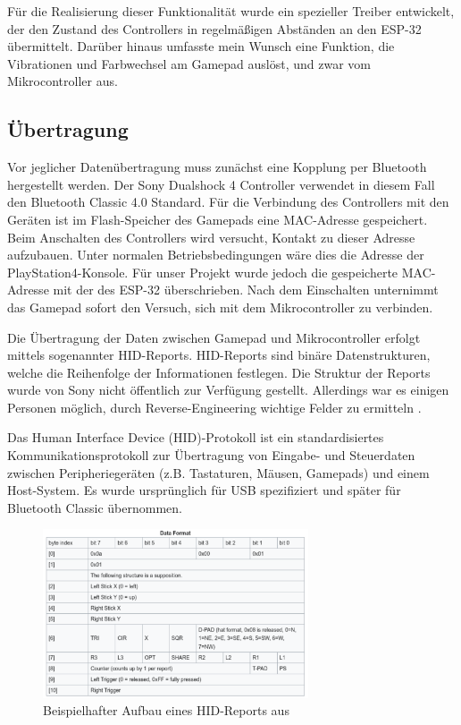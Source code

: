 Für die Realisierung dieser Funktionalität wurde ein spezieller Treiber entwickelt, der den Zustand des Controllers in regelmäßigen Abständen an den ESP-32 übermittelt. 
Darüber hinaus umfasste mein Wunsch eine Funktion, die Vibrationen und Farbwechsel am Gamepad auslöst, und zwar vom Mikrocontroller aus.

\subsection{Übertragung}

Vor jeglicher Datenübertragung muss zunächst eine Kopplung per Bluetooth hergestellt werden. 
Der Sony Dualshock 4 Controller verwendet in diesem Fall den Bluetooth Classic 4.0 Standard.
Für die Verbindung des Controllers mit den Geräten ist im Flash-Speicher des Gamepads eine MAC-Adresse gespeichert. 
Beim Anschalten des Controllers wird versucht, Kontakt zu dieser Adresse aufzubauen.
Unter normalen Betriebsbedingungen wäre dies die Adresse der PlayStation4-Konsole. 
Für unser Projekt wurde jedoch die gespeicherte MAC-Adresse mit der des ESP-32 überschrieben.
Nach dem Einschalten unternimmt das Gamepad sofort den Versuch, sich mit dem Mikrocontroller zu verbinden.

Die Übertragung der Daten zwischen Gamepad und Mikrocontroller erfolgt mittels sogenannter HID-Reports.
HID-Reports sind binäre Datenstrukturen, welche die Reihenfolge der Informationen festlegen.
Die Struktur der Reports wurde von Sony nicht öffentlich zur Verfügung gestellt. 
Allerdings war es einigen Personen möglich, durch Reverse-Engineering wichtige Felder zu ermitteln \cite{esp_ds4_hid_reports}.

Das Human Interface Device (HID)-Protokoll ist ein standardisiertes Kommunikationsprotokoll zur Übertragung von Eingabe- und Steuerdaten zwischen Peripheriegeräten (z.B. Tastaturen, Mäusen, Gamepads) und einem Host-System. 
Es wurde ursprünglich für USB spezifiziert \cite{esp_usb_hid_spec} und später für Bluetooth Classic übernommen.

\begin{figure}[ht]
    \centering
    \includegraphics[width=0.7\textwidth]{images/becker_esp32_ds4_report.png}
    \caption{Beispielhafter Aufbau eines HID-Reports aus \cite{esp_ds4_hid_reports}}
\end{figure}

